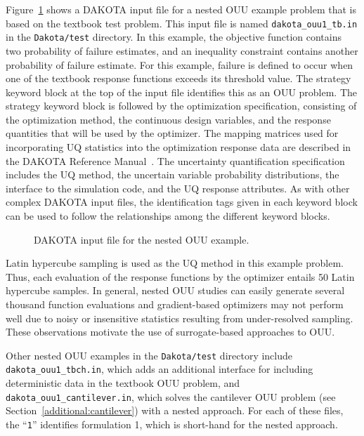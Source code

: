 Figure~\ref{models:ex:figure09} shows a DAKOTA input file for a nested
OUU example problem that is based on the textbook test problem. This
input file is named \texttt{dakota\_ouu1\_tb.in} in the
\texttt{Dakota/test} directory.  In this example, the objective
function contains two probability of failure estimates, and an
inequality constraint contains another probability of failure
estimate. For this example, failure is defined to occur when one of
the textbook response functions exceeds its threshold value. The
strategy keyword block at the top of the input file identifies this as
an OUU problem. The strategy keyword block is followed by the
optimization specification, consisting of the optimization method, the
continuous design variables, and the response quantities that will be
used by the optimizer. The mapping matrices used for incorporating UQ
statistics into the optimization response data are described in the
DAKOTA Reference Manual~\cite{RefMan}. The uncertainty quantification
specification includes the UQ method, the uncertain variable
probability distributions, the interface to the simulation code, and
the UQ response attributes. As with other complex DAKOTA input files,
the identification tags given in each keyword block can be used to
follow the relationships among the different keyword blocks.

\begin{figure}
  \centering
  \begin{bigbox}
    \begin{tiny}
    \end{tiny}
  \end{bigbox}
  \caption{DAKOTA input file for the nested OUU example.}
  \label{models:ex:figure09}
\end{figure}

Latin hypercube sampling is used as the UQ method in this example
problem. Thus, each evaluation of the response functions by the
optimizer entails 50 Latin hypercube samples. In general, nested OUU
studies can easily generate several thousand function evaluations and
gradient-based optimizers may not perform well due to noisy or
insensitive statistics resulting from under-resolved sampling. These
observations motivate the use of surrogate-based approaches to OUU.

Other nested OUU examples in the \texttt{Dakota/test} directory
include \texttt{dakota\_ouu1\_tbch.in}, which adds an additional
interface for including deterministic data in the textbook OUU
problem, and\\ \texttt{dakota\_ouu1\_cantilever.in}, which solves the
cantilever OUU problem (see Section~\ref{additional:cantilever}) with
a nested approach. For each of these files, the ``\texttt{1}''
identifies formulation 1, which is short-hand for the nested approach.

